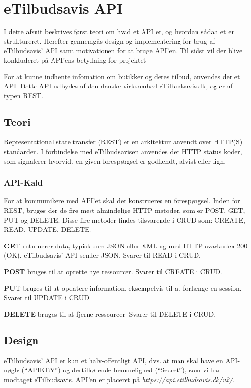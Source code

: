 \section{eTilbudsavis API}\label{api}
I dette afsnit beskrives først teori om hvad et API er, og hvordan sådan et er struktureret.
Herefter gennemgås design og implementering for brug af eTilbudsavis' API samt motivationen for at bruge API'en. 
Til sidst vil der blive konkluderet på API'ens betydning for projektet

For at kunne indhente infomation om butikker og deres tilbud, anvendes der et API.
Dette API udbydes af den danske virksomhed eTilbudsavis.dk, og er af typen REST.

\subsection{Teori}
Representational state transfer (REST) er en arkitektur anvendt over HTTP(S) standarden. 
I forbindelse med eTilbudsavisen anvendes der HTTP status koder, som signalerer hvorvidt en given forespørgsel er godkendt, afvist eller lign.

\subsubsection{API-Kald}
For at kommunikere med API'et skal der konstrueres en forespørgsel.
Inden for REST, bruges der de fire mest almindelige HTTP metoder, som er POST, GET, PUT og DELETE.
Disse fire metoder findes tilsvarende i CRUD som: CREATE, READ, UPDATE, DELETE.

\textbf{GET}
returnerer data, typisk som JSON eller XML og med HTTP svarkoden 200 (OK).
eTilbudsavis' API sender JSON.
Svarer til READ i CRUD.

\textbf{POST}
bruges til at oprette nye ressourcer.
Svarer til CREATE i CRUD.

\textbf{PUT}
bruges til at opdatere information, eksempelvis til at forlænge en session.
Svarer til UPDATE i CRUD.

\textbf{DELETE}
bruges til at fjerne ressourcer.
Svarer til DELETE i CRUD.

\subsection{Design}
eTilbudsavis' API er kun et halv-offentligt API, dvs. at man skal have en API-nøgle (``APIKEY'') og dertilhørende hemmelighed (``Secret''), som vi har modtaget eTilbudsavis.
API'en er placeret på \textit{https://api.etilbudsavis.dk/v2/}. \citep{eTilAPI}

